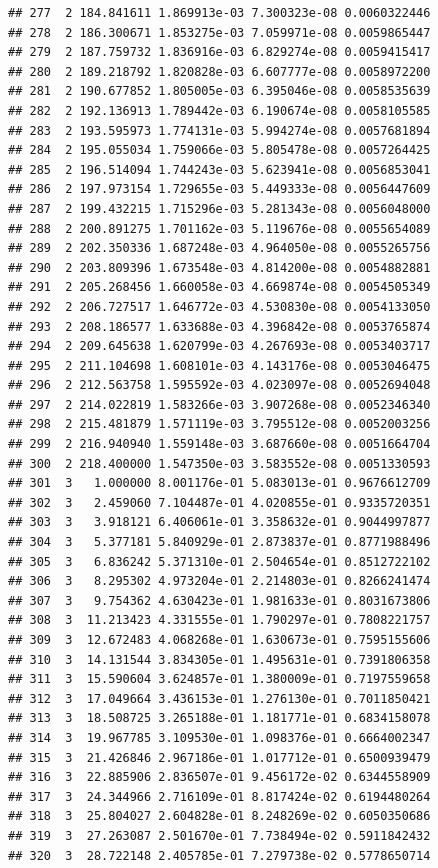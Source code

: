 \documentclass[article]{jss}\usepackage[]{graphicx}\usepackage[]{xcolor}
\makeatletter
\newenvironment{kframe}{%
 \def\at@end@of@kframe{}%
 \ifinner\ifhmode%
  \def\at@end@of@kframe{\end{minipage}}%
  \begin{minipage}{\columnwidth}%
 \fi\fi%
 \def\FrameCommand##1{\hskip\@totalleftmargin \hskip-\fboxsep
 \colorbox{shadecolor}{##1}\hskip-\fboxsep
     \hskip-\linewidth \hskip-\@totalleftmargin \hskip\columnwidth}%
 \MakeFramed {\advance\hsize-\width
   \@totalleftmargin\z@ \linewidth\hsize
   \@setminipage}}%
 {\par\unskip\endMakeFramed%
 \at@end@of@kframe}
\newenvironment{knitrout}{}{} %
\makeatother
\begin{document}
\begin{knitrout}
\begin{kframe}
\begin{verbatim}
## 277  2 184.841611 1.869913e-03 7.300323e-08 0.0060322446
## 278  2 186.300671 1.853275e-03 7.059971e-08 0.0059865447
## 279  2 187.759732 1.836916e-03 6.829274e-08 0.0059415417
## 280  2 189.218792 1.820828e-03 6.607777e-08 0.0058972200
## 281  2 190.677852 1.805005e-03 6.395046e-08 0.0058535639
## 282  2 192.136913 1.789442e-03 6.190674e-08 0.0058105585
## 283  2 193.595973 1.774131e-03 5.994274e-08 0.0057681894
## 284  2 195.055034 1.759066e-03 5.805478e-08 0.0057264425
## 285  2 196.514094 1.744243e-03 5.623941e-08 0.0056853041
## 286  2 197.973154 1.729655e-03 5.449333e-08 0.0056447609
## 287  2 199.432215 1.715296e-03 5.281343e-08 0.0056048000
## 288  2 200.891275 1.701162e-03 5.119676e-08 0.0055654089
## 289  2 202.350336 1.687248e-03 4.964050e-08 0.0055265756
## 290  2 203.809396 1.673548e-03 4.814200e-08 0.0054882881
## 291  2 205.268456 1.660058e-03 4.669874e-08 0.0054505349
## 292  2 206.727517 1.646772e-03 4.530830e-08 0.0054133050
## 293  2 208.186577 1.633688e-03 4.396842e-08 0.0053765874
## 294  2 209.645638 1.620799e-03 4.267693e-08 0.0053403717
## 295  2 211.104698 1.608101e-03 4.143176e-08 0.0053046475
## 296  2 212.563758 1.595592e-03 4.023097e-08 0.0052694048
## 297  2 214.022819 1.583266e-03 3.907268e-08 0.0052346340
## 298  2 215.481879 1.571119e-03 3.795512e-08 0.0052003256
## 299  2 216.940940 1.559148e-03 3.687660e-08 0.0051664704
## 300  2 218.400000 1.547350e-03 3.583552e-08 0.0051330593
## 301  3   1.000000 8.001176e-01 5.083013e-01 0.9676612709
## 302  3   2.459060 7.104487e-01 4.020855e-01 0.9335720351
## 303  3   3.918121 6.406061e-01 3.358632e-01 0.9044997877
## 304  3   5.377181 5.840929e-01 2.873837e-01 0.8771988496
## 305  3   6.836242 5.371310e-01 2.504654e-01 0.8512722102
## 306  3   8.295302 4.973204e-01 2.214803e-01 0.8266241474
## 307  3   9.754362 4.630423e-01 1.981633e-01 0.8031673806
## 308  3  11.213423 4.331555e-01 1.790297e-01 0.7808221757
## 309  3  12.672483 4.068268e-01 1.630673e-01 0.7595155606
## 310  3  14.131544 3.834305e-01 1.495631e-01 0.7391806358
## 311  3  15.590604 3.624857e-01 1.380009e-01 0.7197559658
## 312  3  17.049664 3.436153e-01 1.276130e-01 0.7011850421
## 313  3  18.508725 3.265188e-01 1.181771e-01 0.6834158078
## 314  3  19.967785 3.109530e-01 1.098376e-01 0.6664002347
## 315  3  21.426846 2.967186e-01 1.017712e-01 0.6500939479
## 316  3  22.885906 2.836507e-01 9.456172e-02 0.6344558909
## 317  3  24.344966 2.716109e-01 8.817424e-02 0.6194480264
## 318  3  25.804027 2.604828e-01 8.248269e-02 0.6050350686
## 319  3  27.263087 2.501670e-01 7.738494e-02 0.5911842432
## 320  3  28.722148 2.405785e-01 7.279738e-02 0.5778650714

\end{verbatim}
\end{kframe}
\end{knitrout}
\end{document}
